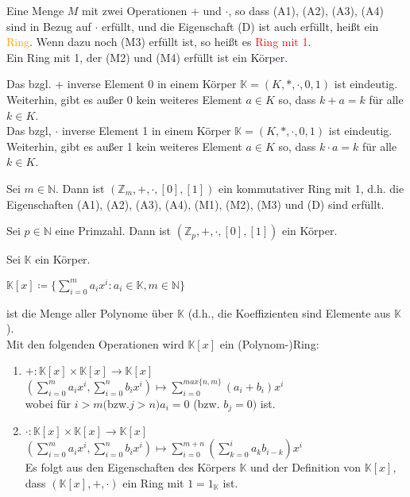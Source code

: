 \begin{definition}
Eine Menge $M$ mit zwei Operationen + und $\cdot$, so dass (A1), (A2), (A3), (A4) sind in Bezug auf $\cdot$ erfüllt, und die Eigenschaft (D) ist auch erfüllt, heißt ein \textcolor{orange}{Ring}. Wenn dazu noch (M3) erfüllt ist, so heißt es \textcolor{red}{Ring mit 1}.\\
Ein Ring mit 1, der (M2) und (M4) erfüllt ist ein Körper.
\end{definition}
\begin{proposition}
Das bzgl. + inverse Element 0 in einem Körper $\mathbb{K} = (K, *, \cdot, 0, 1)$ ist eindeutig. Weiterhin, gibt es außer 0 kein weiteres Element $a \in K$ so, dass $k + a= k$ für alle $k \in K$.\\
Das bzgl, $\cdot$ inverse Element 1 in einem Körper $\mathbb{K} = (K, *, \cdot, 0, 1)$ ist eindeutig. Weiterhin, gibt es außer 1 kein weiteres Element $a \in K$ so, dass $k \cdot a = k$ für alle $k \in K$.
\end{proposition}
\begin{theorem}
Sei $m \in \mathbb{N}$. Dann ist $(\mathbb{Z}_m, +, \cdot, [0], [1])$ ein kommutativer Ring mit 1, d.h. die Eigenschaften (A1), (A2), (A3), (A4), (M1), (M2), (M3) und (D) sind erfüllt.
\end{theorem}
\begin{theorem}
Sei $p \in \mathbb{N}$ eine Primzahl. Dann ist $(\mathbb{Z}_p, +, \cdot, [0], [1])$ ein Körper.
\end{theorem}
\begin{definition}
Sei $\mathbb{K}$ ein Körper.
\begin{center}
    $\mathbb{K}[x] \coloneqq \{\sum_{i = 0}^m a_ix^i : a_i \in \mathbb{K}, m \in \mathbb{N}\}$
\end{center}
ist die Menge aller Polynome über $\mathbb{K}$ (d.h., die Koeffizienten sind Elemente aus $\mathbb{K}$).\\
Mit den folgenden Operationen wird $\mathbb{K}[x]$ ein (Polynom-)Ring:
\begin{enumerate}
    \item $+ : \mathbb{K}[x] \times \mathbb{K}[x] \rightarrow \mathbb{K}[x]$\\
    $(\sum_{i=0}^m a_ix^i, \sum_{i=0}^n b_ix^i) \mapsto \sum_{i=0}^{max\{n,m\}} (a_i + b_i)x^i$\\
    wobei für $i > m ($bzw.$ j > n) a_i = 0$ (bzw. $b_j = 0)$ ist.
    \item $\cdot :\mathbb{K}[x] \times \mathbb{K}[x] \rightarrow \mathbb{K}[x]$\\
    $(\sum_{i=0}^m a_ix^i, \sum_{i=0}^n b_ix^i) \mapsto \sum_{i=0}^{m+n}(\sum_{k=0}^i a_kb_{i-k})x^i$\\
    Es folgt aus den Eigenschaften des Körpers $\mathbb{K}$ und der Definition von $\mathbb{K}[x]$, dass $(\mathbb{K}[x],+,\cdot)$ ein Ring mit $1 = 1_{\mathbb{K}}$ ist.
\end{enumerate}
\end{definition}
